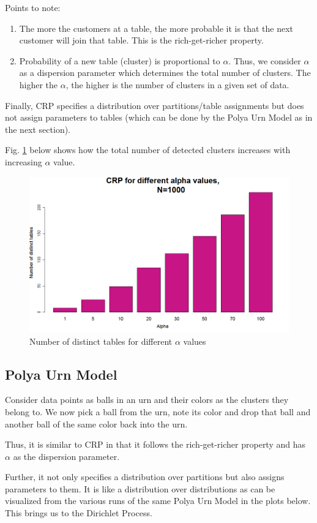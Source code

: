 \documentclass{article} %
\begin{document}
Points to note:
\begin{enumerate}
\item The more the customers at a table, the more probable it is that the next customer will join that table. This is the rich-get-richer property.
\item Probability of a new table (cluster) is proportional to $\alpha$. Thus, we consider $\alpha$ as a dispersion parameter which determines the total number of clusters. The higher the $\alpha$, the higher is the number of clusters in a given set of data.
\end{enumerate}
Finally, CRP specifies a distribution over partitions/table assignments but does not assign parameters to tables (which can be done by the Polya Urn Model as in the next section).

Fig. \ref{fig:crp} below shows how the total number of detected clusters increases with increasing $\alpha$ value.
\begin{figure}[h]
\begin{center}
\includegraphics[width=.5\linewidth]{crp.png}
\caption{Number of distinct tables for different $\alpha$ values}
\label{fig:crp}
\end{center}
\end{figure}


\subsection{Polya Urn Model}
Consider data points as balls in an urn and their colors as the clusters they belong to. We now pick a ball from the urn, note its color and drop that ball and another ball of the same color back into the urn.

Thus, it is similar to CRP in that it follows the rich-get-richer property and has $\alpha$ as the dispersion parameter.

Further, it not only specifies a distribution over partitions but also assigns parameters to them. It is like a distribution over distributions as can be visualized from the various runs of the same Polya Urn Model in the plots below. This brings us to the Dirichlet Process.
\end{document}
